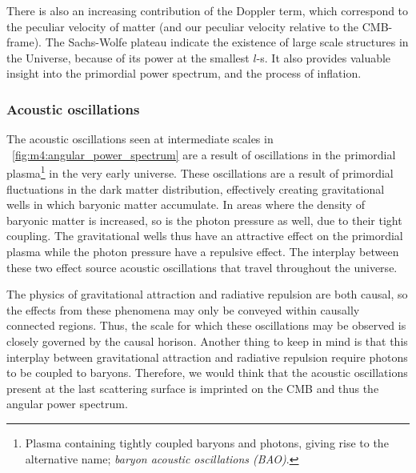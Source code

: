         There is also an increasing contribution of the Doppler term, which correspond to the peculiar velocity of matter (and our peculiar velocity relative to the CMB-frame). The Sachs-Wolfe plateau indicate the existence of large scale structures in the Universe, because of its power at the smallest $l$-s. It also provides valuable insight into the primordial power spectrum, and the process of inflation. 

    \subsubsection{Acoustic oscillations}
        The acoustic oscillations seen at intermediate scales in ~\cref{fig:m4:angular_power_spectrum} are a result of oscillations in the primordial plasma\footnote{Plasma containing tightly coupled baryons and photons, giving rise to the alternative name; \textit{baryon acoustic oscillations (BAO)}.} in the very early universe. These oscillations are a result of primordial fluctuations in the dark matter distribution, effectively creating gravitational wells in which baryonic matter accumulate. In areas where the density of baryonic matter is increased, so is the photon pressure as well, due to their tight coupling. The gravitational wells thus have an attractive effect on the primordial plasma while the photon pressure have a repulsive effect. The interplay between these two effect source acoustic oscillations that travel throughout the universe. 

        The physics of gravitational attraction and radiative repulsion are both causal, so the effects from these phenomena may only be conveyed within causally connected regions. Thus, the scale for which these oscillations may be observed is closely governed by the causal horison. Another thing to keep in mind is that this interplay between gravitational attraction and radiative repulsion require photons to be coupled to baryons. Therefore, we would think that the acoustic oscillations present at the last scattering surface is imprinted on the CMB and thus the angular power spectrum.

